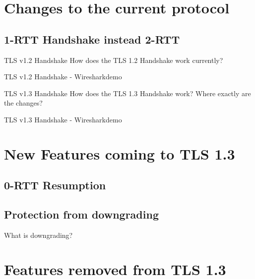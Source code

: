 \documentclass{f4_beamer_metropolis}
\begin{document}
\section{Changes to the current protocol}

\subsection{1-RTT Handshake instead 2-RTT}

\begin{frame}{TLS v1.2 Handshake}
How does the TLS 1.2 Handshake work currently?
\end{frame}

\begin{frame}[standout]
  TLS v1.2 Handshake - Wiresharkdemo
\end{frame}

\begin{frame}{TLS v1.3 Handshake}
  How does the TLS 1.3 Handshake work?
  Where exactly are the changes?
\end{frame}

\begin{frame}[standout]
  TLS v1.3 Handshake - Wiresharkdemo
\end{frame}

\section{New Features coming to TLS 1.3}

\subsection{0-RTT Resumption}

\begin{frame}

\end{frame}

\subsection{Protection from downgrading}

\begin{frame}{What is downgrading?}

\end{frame}

\section{Features removed from TLS 1.3}
\end{document}
